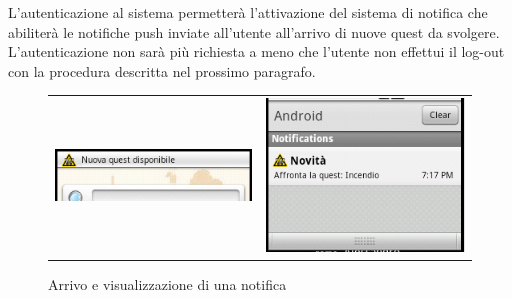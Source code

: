 L'autenticazione al sistema permetterà l'attivazione del sistema di notifica che abiliterà le notifiche push inviate all'utente all'arrivo di nuove quest da svolgere. L'autenticazione non sarà più richiesta a meno che l'utente non effettui il log-out con la procedura descritta nel prossimo paragrafo.


\begin{center}
\begin{figure}[H]
\centering
\begin{tabular}{ m{5.5cm} m{5.5cm}}
\includegraphics[scale=0.65]{images/notificaChiusa.png} & 
\includegraphics[scale=0.65]{images/notificaInApertura.png} \\
\end{tabular}
\caption{Arrivo e visualizzazione di una notifica}
\end{figure}
\end{center}


